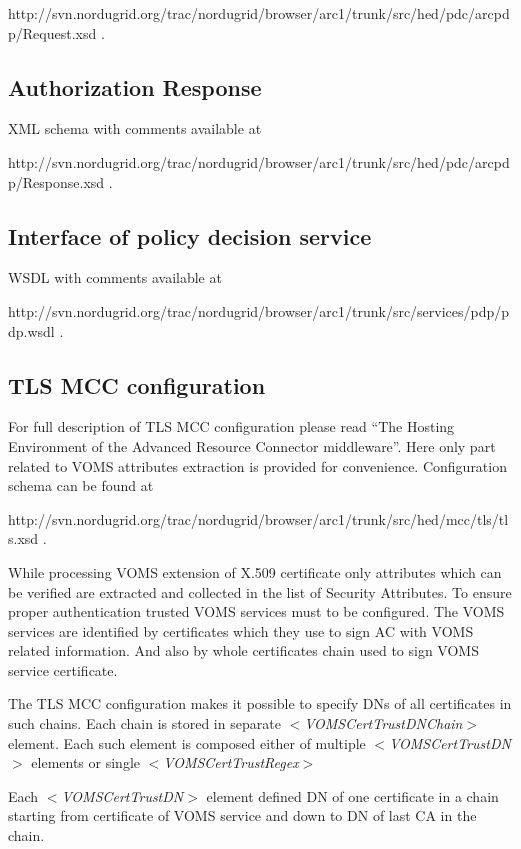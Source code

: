 \documentclass{article}                            %
\begin{document}
http://svn.nordugrid.org/trac/nordugrid/browser/arc1/trunk/src/hed/pdc/arcpdp/Request.xsd .


\subsection{Authorization Response} %
\label{subsec:authz_response}
XML schema with comments available at 

http://svn.nordugrid.org/trac/nordugrid/browser/arc1/trunk/src/hed/pdc/arcpdp/Response.xsd .


\subsection{Interface of policy decision service} %
\label{subsec:interface_pds}
WSDL with comments available at 

http://svn.nordugrid.org/trac/nordugrid/browser/arc1/trunk/src/services/pdp/pdp.wsdl .


\subsection{TLS MCC configuration} %
\label{subsec:tlsmcc_conf}
For full description of TLS MCC configuration please read ``The Hosting Environment of the Advanced Resource Connector middleware''. Here only part related to VOMS attributes extraction is provided for convenience. Configuration schema can be found at 

http://svn.nordugrid.org/trac/nordugrid/browser/arc1/trunk/src/hed/mcc/tls/tls.xsd .

While processing VOMS extension of X.509 certificate only attributes which can be verified are extracted and collected in the list of Security Attributes. To ensure proper authentication trusted VOMS services must to be configured. The VOMS services are identified by certificates which they use to sign AC with VOMS related information. And also by whole certificates chain used to sign VOMS service certificate. 

The TLS MCC configuration makes it possible to specify DNs of all certificates in such chains. Each chain is stored in separate \textit{$<$VOMSCertTrustDNChain$>$} element. Each such element is composed either of multiple \textit{$<$VOMSCertTrustDN$>$} elements or single \textit{$<$VOMSCertTrustRegex$>$}

Each \textit{$<$VOMSCertTrustDN$>$} element defined DN of one certificate in a chain starting from certificate of VOMS service and down to DN of last CA in the chain.
\end{document}
